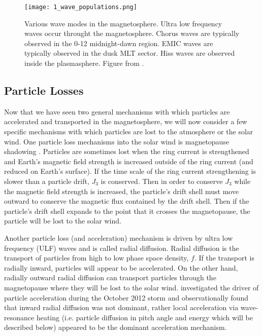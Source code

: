 \begin{figure}
\texttt{[image: 1\_wave\_populations.png]}
\caption{Various wave modes in the magnetosphere. Ultra low frequency waves occur throught the magnetosphere. Chorus waves are typically observed in the 0-12 midnight-dawn region. EMIC waves are typically observed in the dusk MLT sector. Hiss waves are observed inside the plasmasphere. Figure from \citet{Millan2007}.}
\label{Intro:waves}
\end{figure}

\subsection{Particle Losses}\label{Intro:losses}
Now that we have seen two general mechanisms with which particles are accelerated and transported in the magnetosphere, we will now consider a few specific mechanisms with which particles are lost to the atmosphere or the solar wind. One particle loss mechanisms into the solar wind is magnetopause shadowing \citep[e.g.][]{Ukhorskiy2006}. Particles are sometimes lost when the ring current is strengthened and Earth's magnetic field strength is increased outside of the ring current (and reduced on Earth's surface). If the time scale of the ring current strengthening is slower than a particle drift, $J_3$ is conserved. Then in order to conserve $J_3$ while the magnetic field strength is increased, the particle's drift shell must move outward to conserve the magnetic flux contained by the drift shell. Then if the particle's drift shell expands to the point that it crosses the magnetopause, the particle will be lost to the solar wind.

Another particle loss (and acceleration) mechanism is driven by ultra low frequency (ULF) waves and is called radial diffusion. Radial diffusion is the transport of particles from high to low phase space density, $f$. If the transport is radially inward, particles will appear to be accelerated. On the other hand, radially outward radial diffusion can transport particles through the magnetopause where they will be lost to the solar wind. \citet{Reeves2013} investigated the driver of particle acceleration during the October 2012 storm and observationally found that inward radial diffusion was not dominant, rather local acceleration via wave-resonance heating (i.e. particle diffusion in pitch angle and energy which will be described below) appeared to be the dominant acceleration mechanism.

